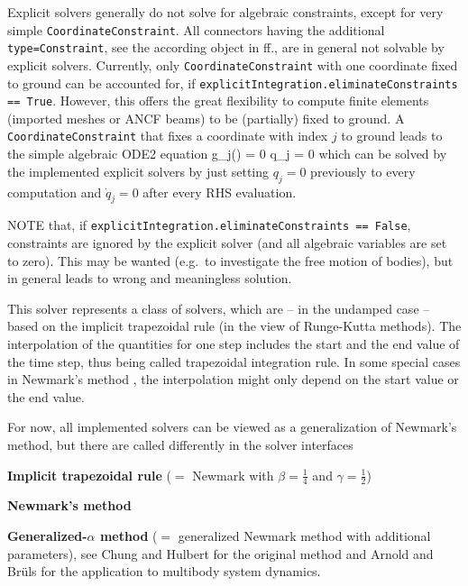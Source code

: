 Explicit solvers generally do not solve for algebraic constraints, except for very simple \texttt{CoordinateConstraint}. 
All connectors having the additional \texttt{type=Constraint}, see the according object in ff., 
are in general not solvable by explicit solvers. 
Currently, only \texttt{CoordinateConstraint} with one coordinate fixed to ground can be accounted for, 
if \texttt{explicitIntegration.eliminateConstraints == True}. 
However, this offers the great flexibility to compute finite elements (imported meshes or ANCF beams) to be (partially) fixed to ground.
A \texttt{CoordinateConstraint} that fixes a coordinate with index $j$ to ground leads to the simple algebraic ODE2 equation
\be
	g_j(\qv) = 0 \quad \Leftrightarrow \quad  q_j = 0
\ee
which can be solved by the implemented explicit solvers by just setting $q_j = 0$ previously to every computation and $\dot q_j = 0$ after every RHS evaluation.

NOTE that, if \texttt{explicitIntegration.eliminateConstraints == False}, constraints are ignored by the explicit solver (and all algebraic variables are set to zero). This may be wanted (e.g.\ to investigate the free motion of bodies), but in general leads to wrong and meaningless solution.

\label{sec:ImplicitTrapezoidalSolver}
This solver represents a class of solvers, which are -- in the undamped case -- based on the implicit trapezoidal rule (in the view of Runge-Kutta methods). The interpolation of the quantities for one step includes the start and the end value of the time step, thus being called trapezoidal integration rule. In some special cases in Newmark's method \cite{Newmark1959}, the interpolation might only depend on the start value or the end value.

For now, all implemented solvers can be viewed as a generalization of Newmark's method, but there are called differently in the solver interfaces
\bi
  \item {\bf Implicit trapezoidal rule} ($=$ Newmark with $\beta = \frac 1 4$ and $\gamma = \frac 1 2$) 
	\item {\bf Newmark's method} \cite{Newmark1959}
	\item {\bf Generalized-$\alpha$ method} ($=$ generalized Newmark method with additional parameters), see Chung and Hulbert \cite{Chung1993} for the original method and Arnold and Br\"uls \cite{Arnold2007} for the application to multibody system dynamics.
\ei

